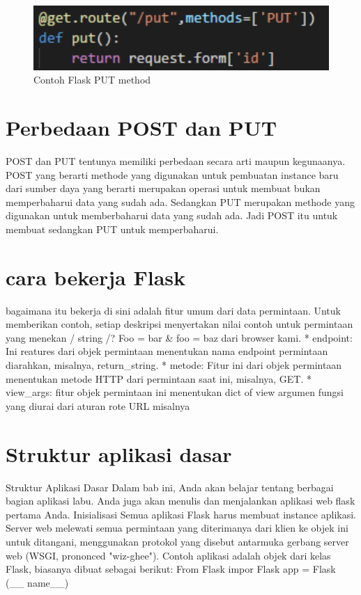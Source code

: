 \begin{figure}[ht]
    \centerline{\includegraphics[width=1\textwidth]{figures/put.png}}
    \caption{Contoh Flask PUT method}
    \label{4PUT}
\end{figure}

\section{Perbedaan POST dan PUT}
POST dan PUT tentunya memiliki perbedaan secara arti maupun kegunaanya. POST yang berarti methode yang digunakan untuk pembuatan
instance baru dari sumber daya yang berarti merupakan operasi untuk membuat bukan memperbaharui data yang sudah ada. 
Sedangkan PUT merupakan methode yang digunakan untuk memberbaharui data yang sudah ada. Jadi POST itu untuk membuat 
sedangkan PUT untuk memperbaharui.

\section{cara bekerja Flask}
bagaimana itu bekerja
 di sini adalah fitur umum dari data permintaan. Untuk memberikan contoh, setiap deskripsi menyertakan nilai contoh untuk permintaan yang menekan / string /? Foo = bar & foo = baz dari browser kami.    
* endpoint: Ini reatures dari objek permintaan menentukan nama endpoint permintaan diarahkan, misalnya, return_string.    
* metode: Fitur ini dari objek permintaan menentukan metode HTTP dari permintaan saat ini, misalnya, GET.   
* view_args: fitur objek permintaan ini menentukan dict of view argumen fungsi yang diurai dari aturan rote URL misalnya 

\section{Struktur aplikasi dasar}
Struktur Aplikasi Dasar 
Dalam bab ini, Anda akan belajar tentang berbagai bagian aplikasi labu. Anda juga akan menulis dan menjalankan aplikasi web flask pertama Anda. 
Inisialisasi 
Semua aplikasi Flask harus membuat instance aplikasi. Server web melewati semua permintaan yang diterimanya dari klien ke objek ini untuk ditangani, menggunakan protokol yang disebut antarmuka gerbang server web (WSGI, prononced "wiz-ghee"). Contoh aplikasi adalah objek dari kelas Flask, biasanya dibuat sebagai berikut: 
From Flask impor Flask 
app = Flask (__ name__)

